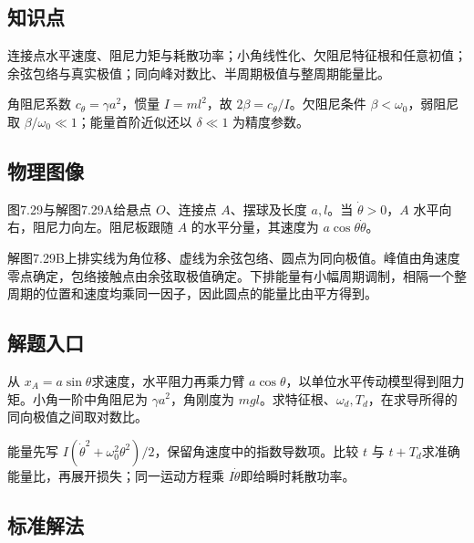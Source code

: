 \documentclass[UTF8,fontset=fandol,a4paper,11pt]{ctexart}
\begin{document}


\subsection*{知识点}

连接点水平速度、阻尼力矩与耗散功率；小角线性化、欠阻尼特征根和任意初值；余弦包络与真实极值；同向峰对数比、半周期极值与整周期能量比。

角阻尼系数 $c_\theta=\gamma a^2$，惯量 $I=ml^2$，故 $2\beta=c_\theta/I$。欠阻尼条件 $\beta<\omega_0$，弱阻尼取 $\beta/\omega_0\ll1$；能量首阶近似还以 $\delta\ll1$ 为精度参数。




\subsection*{物理图像}

图7.29与解图7.29A给悬点 $O$、连接点 $A$、摆球及长度 $a,l$。当 $\dot\theta>0$，$A$ 水平向右，阻尼力向左。阻尼板跟随 $A$ 的水平分量，其速度为 $a\cos\theta\dot\theta$。

解图7.29B上排实线为角位移、虚线为余弦包络、圆点为同向极值。峰值由角速度零点确定，包络接触点由余弦取极值确定。下排能量有小幅周期调制，相隔一个整周期的位置和速度均乘同一因子，因此圆点的能量比由平方得到。




\subsection*{解题入口}

从 $x_A=a\sin\theta$求速度，水平阻力再乘力臂 $a\cos\theta$，以单位水平传动模型得到阻力矩。小角一阶中角阻尼为 $\gamma a^2$，角刚度为 $mgl$。求特征根、$\omega_d,T_d$，在求导所得的同向极值之间取对数比。

能量先写 $I(\dot\theta^2+\omega_0^2\theta^2)/2$，保留角速度中的指数导数项。比较 $t$ 与 $t+T_d$求准确能量比，再展开损失；同一运动方程乘 $I\dot\theta$即给瞬时耗散功率。



\subsection*{标准解法}
\end{document}
